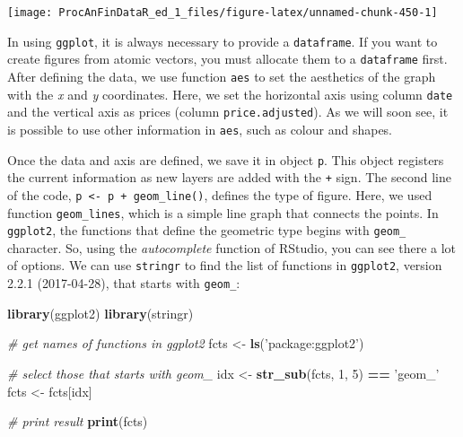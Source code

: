 \documentclass[11pt,]{book}
\newenvironment{Shaded}{\begin{snugshade}}{\end{snugshade}}
\newcommand{\KeywordTok}[1]{\textcolor[rgb]{0.27,0.27,0.27}{\textbf{#1}}}
\newcommand{\DecValTok}[1]{\textcolor[rgb]{0.06,0.06,0.06}{#1}}
\newcommand{\StringTok}[1]{\textcolor[rgb]{0.5,0.5,0.5}{#1}}
\newcommand{\CommentTok}[1]{\textcolor[rgb]{0.56,0.35,0.01}{\textit{#1}}}
\newcommand{\OperatorTok}[1]{\textcolor[rgb]{0.81,0.36,0.00}{\textbf{#1}}}
\newcommand{\NormalTok}[1]{#1}
\begin{document}
\begin{center}\texttt{[image: ProcAnFinDataR\_ed\_1\_files/figure-latex/unnamed-chunk-450-1]} \end{center}

In using \texttt{ggplot}, it is always necessary to provide a
\texttt{dataframe}. If you want to create figures from atomic vectors,
you must allocate them to a \texttt{dataframe} first. After defining the
data, we use function \texttt{aes} to set the aesthetics of the graph
with the \emph{x} and \emph{y} coordinates. Here, we set the horizontal
axis using column \texttt{date} and the vertical axis as prices (column
\texttt{price.adjusted}). As we will soon see, it is possible to use
other information in \texttt{aes}, such as colour and shapes.

Once the data and axis are defined, we save it in object \texttt{p}.
This object registers the current information as new layers are added
with the \texttt{+} sign. The second line of the code,
\texttt{p\ \textless{}-\ p\ +\ geom\_line()}, defines the type of
figure. Here, we used function \texttt{geom\_lines}, which is a simple
line graph that connects the points. In \texttt{ggplot2}, the functions
that define the geometric type begins with \texttt{geom\_} character.
So, using the \emph{autocomplete} function of RStudio, you can see there
a lot of options. We can use \texttt{stringr} to find the list of
functions in \texttt{ggplot2}, version 2.2.1 (2017-04-28), that starts
with \texttt{geom\_}: 

\begin{Shaded}
\begin{Highlighting}[]
\KeywordTok{library}\NormalTok{(ggplot2)}
\KeywordTok{library}\NormalTok{(stringr)}

\CommentTok{# get names of functions in ggplot2}
\NormalTok{fcts <-}\StringTok{ }\KeywordTok{ls}\NormalTok{(}\StringTok{'package:ggplot2'}\NormalTok{)}

\CommentTok{# select those that starts with geom_}
\NormalTok{idx <-}\StringTok{ }\KeywordTok{str_sub}\NormalTok{(fcts, }\DecValTok{1}\NormalTok{, }\DecValTok{5}\NormalTok{) }\OperatorTok{==}\StringTok{ 'geom_'}
\NormalTok{fcts <-}\StringTok{ }\NormalTok{fcts[idx]}

\CommentTok{# print result}
\KeywordTok{print}\NormalTok{(fcts)}
\end{Highlighting}
\end{Shaded}
\end{document}
